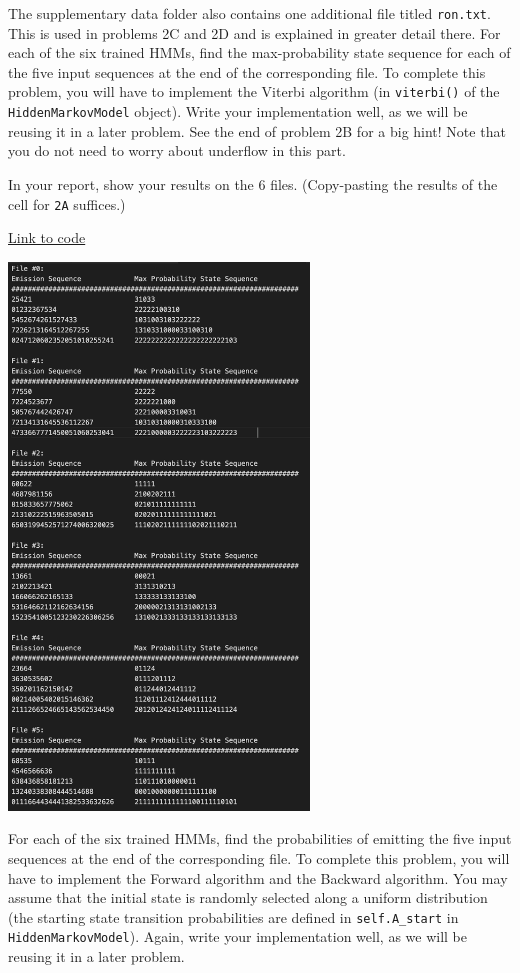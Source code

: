 The supplementary data folder also contains one additional file titled \texttt{ron.txt}. This is used in problems 2C and 2D and is explained in greater detail there. 
\indent\problem[10] %
For each of the six trained HMMs, find the max-probability state sequence for each of the five input sequences at the end of the corresponding file. To complete this problem, you will have to implement the Viterbi algorithm (in \texttt{viterbi()} of the \texttt{HiddenMarkovModel} object). Write your implementation well, as we will be reusing it in a later problem. See the end of problem 2B for a big hint! Note that you do not need to worry about underflow in this part.

In your report, show your results on the 6 files. (Copy-pasting the results of the cell for \texttt{2A} suffices.)
\begin{solution}   
  \href{https://colab.research.google.com/drive/1Rrg0gpfLqg3G2KZZfZJjnOL_cBieTled}{Link to code}
    \begin{center}
      \includegraphics[width=0.6\textwidth]{prob2a.png}
    \end{center}
\end{solution}

\indent\problem[17] %
For each of the six trained HMMs, find the probabilities of emitting the five input sequences at the end of the corresponding file. To complete this problem, you will have to implement the Forward algorithm and the Backward algorithm. You may assume that the initial state is randomly selected along a uniform distribution (the starting state transition probabilities are defined in \texttt{self.A\_start} in \texttt{HiddenMarkovModel}). Again, write your implementation well, as we will be reusing it in a later problem. \\

